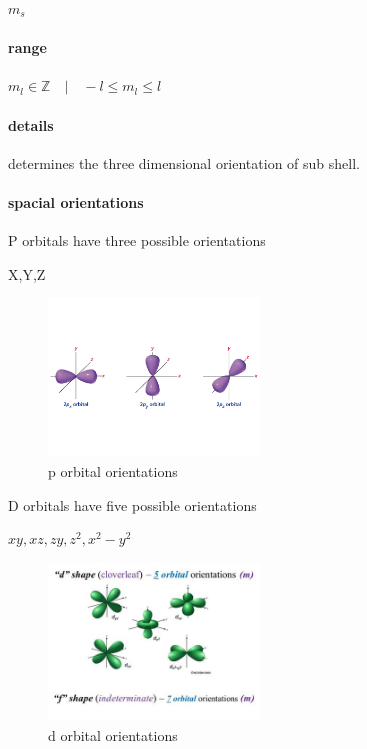 \documentclass[]{article}
\let\oldparagraph\paragraph
\renewcommand{\paragraph}[1]{\oldparagraph{#1}\mbox{}}
\begin{document}
\(m_s\)

\paragraph{range}\label{range-2}

\(m_{l} \in \mathbb{Z} \quad | \quad -l \leq m_{l} \leq l\quad\)

\paragraph{details}\label{details-2}

determines the three dimensional orientation of sub shell.

\paragraph{spacial orientations}\label{spacial-orientations}

P orbitals have three possible orientations

X,Y,Z

\begin{figure}
\centering
\includegraphics[width=0.50000\textwidth]{Images/dOrbitalOrientation.jpg}
\caption{p orbital orientations}
\end{figure}

D orbitals have five possible orientations

\(xy,xz,zy,z^{2},x^{2}-y^{2}\)

\begin{figure}
\centering
\includegraphics[width=0.50000\textwidth]{Images/dOrbitalOrientations.jpg}
\caption{d orbital orientations}
\end{figure}
\end{document}
